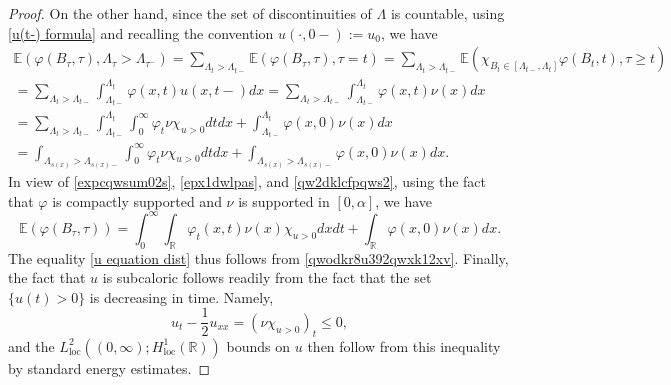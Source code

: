 \documentclass[10pt,a4paper]{amsart}
\def\E{{\mathbb{E}}}
\def\R{{\mathbb{R}}}
\begin{document}
\begin{proof}
On the other hand, since the set of discontinuities of $\Lambda$ is countable, using \eqref{u(t-) formula} and recalling the convention $u(\cdot,0-):=u_0$, we have
\begin{multline}  \label{qw2dklcfpqws2}   \E(\varphi(B_{\tau},\tau),\Lambda_{\tau}>\Lambda_{\tau^-})
=\sum_{\Lambda_{t}>\Lambda_{t-}}\E(\varphi(B_{\tau},\tau),\tau= t)
=\sum_{\Lambda_{t}>\Lambda_{t-}}\E(\chi_{B_t \in [\Lambda_{t-},\Lambda_t]}\varphi(B_{t},t),\tau\geq t)\\=\sum_{\Lambda_{t}>\Lambda_{t-}}\int_{\Lambda_{t-}}^{\Lambda_{t}}\varphi(x,t)u(x,t-)dx
=\sum_{\Lambda_{t}>\Lambda_{t-}}\int_{\Lambda_{t-}}^{\Lambda_{t}}\varphi(x,t)\nu(x)dx
\\=\sum_{\Lambda_{t}>\Lambda_{t-}}\int_{\Lambda_{t-}}^{\Lambda_{t}}\int_{0}^{\infty}\varphi_t\nu\chi_{u>0}dtdx+\int_{\Lambda_{t-}}^{\Lambda_t}\varphi(x,0)\nu(x)dx\\
=\int_{\Lambda_{s(x)}>\Lambda_{s(x)-}}\int_0^{\infty}\varphi_t\nu \chi_{u>0}dtdx+\int_{\Lambda_{s(x)}>\Lambda_{s(x)-}}\varphi(x,0)\nu(x)dx.
\end{multline}
In view of \eqref{expcqwsum02s}, \eqref{epx1dwlpas}, and \eqref{qw2dklcfpqws2}, using the fact that $\varphi$ is compactly supported and $\nu$ is supported in $[0,\alpha]$, we have
\begin{equation}
\E(\varphi(B_{\tau},\tau))=\int_{0}^{\infty}\int_{\R}\varphi_t(x,t)\nu(x)\chi_{u>0}dxdt+\int_{\R}\varphi(x,0)\nu(x)dx. 
\end{equation}
The equality \eqref{u equation dist} thus follows from \eqref{qwodkr8u392qwxk12xv}. Finally, the fact that $u$ is subcaloric follows readily from the fact that the set $\{u(t)>0\}$ is decreasing in time. Namely,
\[u_t-\frac12u_{xx}=(\nu\chi_{u>0})_t\leq0,\]
and the $L^2_{\operatorname{loc}}((0,\infty);H^1_{\operatorname{loc}}(\R))$ bounds on $u$ then follow from this inequality by standard energy estimates.
\end{proof}
\end{document}
